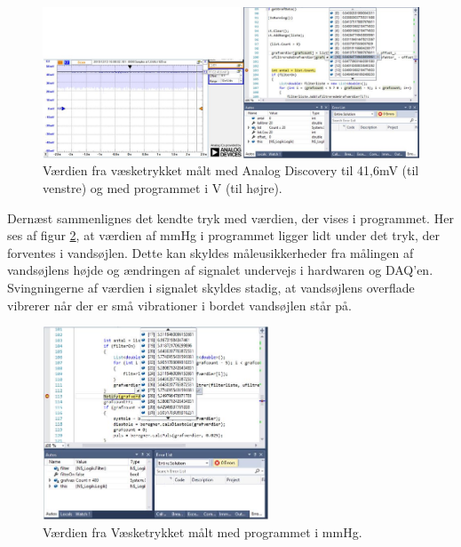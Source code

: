 \begin{figure}[H]
	\centering
	\includegraphics[width=1.1\textwidth]{Figurer/Test/Vandsoejle}
	\caption{Værdien fra væsketrykket målt med Analog Discovery til 41,6mV (til venstre) og med programmet i V (til højre).}
	\label{fig:Vaesketryk2}
\end{figure}

Dernæst sammenlignes det kendte tryk med værdien, der vises i programmet. Her ses af figur \ref{fig:mmHgtryk}, at værdien af mmHg i programmet ligger lidt under det tryk, der forventes i vandsøjlen. Dette kan skyldes måleusikkerheder fra målingen af vandsøjlens højde og ændringen af signalet undervejs i hardwaren og DAQ’en. Svingningerne af værdien i signalet skyldes stadig, at vandsøjlens overflade vibrerer når der er små vibrationer i bordet vandsøjlen står på.  

\begin{figure}[H]
	\centering
	\includegraphics[width=0.6\textwidth]{Figurer/Test/mmHg}
	\caption{Værdien fra Væsketrykket målt med programmet i mmHg.}
	\label{fig:mmHgtryk}
\end{figure}